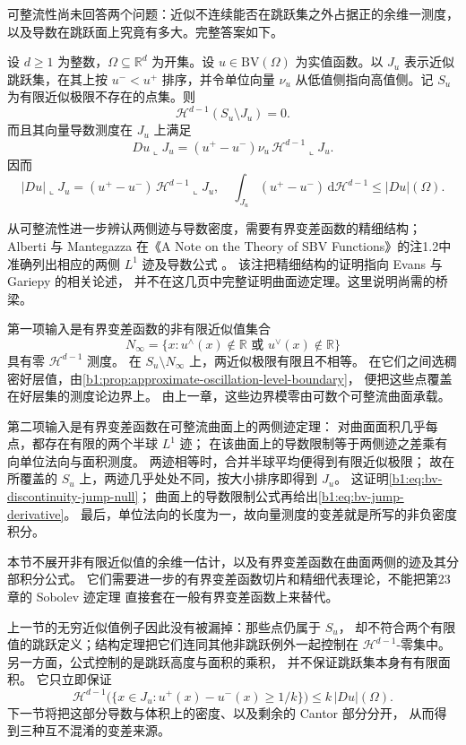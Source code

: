 可整流性尚未回答两个问题：近似不连续能否在跳跃集之外占据正的余维一测度，
以及导数在跳跃面上究竟有多大。完整答案如下。
\begin{theorem}\label{b1:thm:bv-jump-structure}
设 \(d\ge1\) 为整数，\(\Omega\subseteq\mathbb R^d\) 为开集。设 \(u\in\mathrm{BV}(\Omega)\) 为实值函数。以 \(J_u\) 表示近似跳跃集，在其上按 \(u^-<u^+\) 排序，并令单位向量 \(\nu_u\) 从低值侧指向高值侧。记 \(S_u\) 为有限近似极限不存在的点集。则
\begin{equation}\label{b1:eq:bv-discontinuity-jump-null}
 \mathcal H^{d-1}(S_u\setminus J_u)=0.
\end{equation}
而且其向量导数测度在 \(J_u\) 上满足
\begin{equation}\label{b1:eq:bv-jump-derivative}
 Du\llcorner J_u
 =(u^+-u^-)\nu_u\,\mathcal H^{d-1}\llcorner J_u.
\end{equation}
因而
\[
 |Du|\llcorner J_u
 =(u^+-u^-)\,\mathcal H^{d-1}\llcorner J_u,
 \quad
 \int_{J_u}(u^+-u^-)\,\mathrm d\mathcal H^{d-1}
 \le |Du|(\Omega).
\]
\end{theorem}
\begin{proofsketch}
从可整流性进一步辨认两侧迹与导数密度，需要有界变差函数的精细结构；
Alberti 与 Mantegazza 在《A Note on the Theory of SBV Functions》的注1.2中准确列出相应的两侧 \(L^1\) 迹及导数公式%
\cite[Remark 1.2, pp. 376--377]{AlbertiMantegazza1997SBV}。
该注把精细结构的证明指向 Evans 与 Gariepy 的相关论述，
并不在这几页中完整证明曲面迹定理。这里说明尚需的桥梁。

第一项输入是有界变差函数的非有限近似值集合
\[
 N_\infty
 =\{x:u^\wedge(x)\notin\mathbb R
          \text{ 或 }u^\vee(x)\notin\mathbb R\}
\]
具有零 \(\mathcal H^{d-1}\) 测度。
在 \(S_u\setminus N_\infty\) 上，两近似极限有限且不相等。
在它们之间选稠密好层值，由\cref{b1:prop:approximate-oscillation-level-boundary}，
便把这些点覆盖在好层集的测度论边界上。
由上一章，这些边界模零由可数个可整流曲面承载。

第二项输入是有界变差函数在可整流曲面上的两侧迹定理：
对曲面面积几乎每点，都存在有限的两个半球 \(L^1\) 迹；
在该曲面上的导数限制等于两侧迹之差乘有向单位法向与面积测度。
两迹相等时，合并半球平均便得到有限近似极限；
故在所覆盖的 \(S_u\) 上，两迹几乎处处不同，按大小排序即得到 \(J_u\)。
这证明\eqref{b1:eq:bv-discontinuity-jump-null}；
曲面上的导数限制公式再给出\eqref{b1:eq:bv-jump-derivative}。
最后，单位法向的长度为一，故向量测度的变差就是所写的非负密度积分。

本节不展开非有限近似值的余维一估计，以及有界变差函数在曲面两侧的迹及其分部积分公式。
它们需要进一步的有界变差函数切片和精细代表理论，不能把第23章的 Sobolev 迹定理
直接套在一般有界变差函数上来替代。
\end{proofsketch}

上一节的无穷近似值例子因此没有被漏掉：那些点仍属于 \(S_u\)，
却不符合两个有限值的跳跃定义；结构定理把它们连同其他非跳跃例外一起控制在
\(\mathcal H^{d-1}\)-零集中。
另一方面，公式控制的是跳跃高度与面积的乘积，
并不保证跳跃集本身有有限面积。
它只立即保证
\[
 \mathcal H^{d-1}
 \bigl(\{x\in J_u:u^+(x)-u^-(x)\ge 1/k\}\bigr)
 \le k\,|Du|(\Omega).
\]
下一节将把这部分导数与体积上的密度、以及剩余的 Cantor 部分分开，
从而得到三种互不混淆的变差来源。

